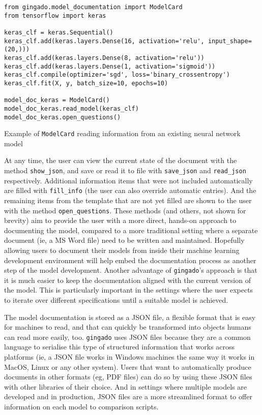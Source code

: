 \documentclass{article}
\begin{document}
\begin{listing}[h]
\begin{verbatim}
from gingado.model_documentation import ModelCard
from tensorflow import keras

keras_clf = keras.Sequential()
keras_clf.add(keras.layers.Dense(16, activation='relu', input_shape=(20,)))
keras_clf.add(keras.layers.Dense(8, activation='relu'))
keras_clf.add(keras.layers.Dense(1, activation='sigmoid'))
keras_clf.compile(optimizer='sgd', loss='binary_crossentropy')
keras_clf.fit(X, y, batch_size=10, epochs=10)

model_doc_keras = ModelCard()
model_doc_keras.read_model(keras_clf)
model_doc_keras.open_questions()
\end{verbatim} 
\caption{Example of \texttt{ModelCard} reading information from an existing neural network model}
\label{ModelCard}
\end{listing}

At any time, the user can view the current state of the document with the method \texttt{show\_json}, and save or read it to file with \texttt{save\_json} and \texttt{read\_json} respectively. Additional information items that were not included automatically are filled with \texttt{fill\_info} (the user can also override automatic entries). And the remaining items from the template that are not yet filled are shown to the user with the method \texttt{open\_questions}. These methods (and others, not shown for brevity) aim to provide the user with a more direct, hands-on approach to documenting the model, compared to a more traditional setting where a separate document (ie, a MS Word file) need to be written and maintained. Hopefully allowing users to document their models from inside their machine learning development environment will help embed the documentation process as another step of the model development. Another advantage of \texttt{gingado}'s approach is that it is much easier to keep the documentation aligned with the current version of the model. This is particularly important in the settings where the user expects to iterate over different specifications until a suitable model is achieved.

The model documentation is stored as a JSON file, a flexible format that is easy for machines to read, and that can quickly be transformed into objects humans can read more easily, too. \texttt{gingado} uses JSON files because they are a common language to serialise this type of structured information that works across platforms (ie, a JSON file works in Windows machines the same way it works in MacOS, Linux or any other system). Users that want to automatically produce documents in other formats (eg, PDF files) can do so by using these JSON files with other libraries of their choice. And in settings where multiple models are developed and in production, JSON files are a more streamlined format to offer information on each model to comparison scripts.
\end{document}
